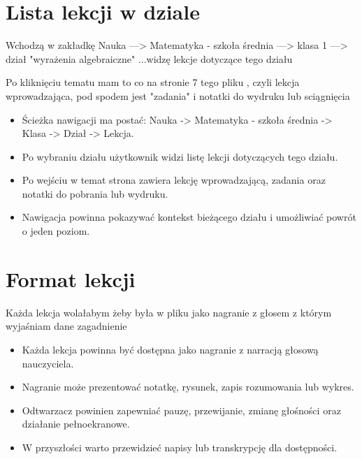 \documentclass[12pt,a4paper]{report}
\begin{document}
\section{Lista lekcji w dziale}
\begin{ElearnReviewComment}[title={Komentarz nr 11 -- Anna Kogut, 2026-07-22}]
Wchodzą w zakładkę Nauka ---> Matematyka - szkoła średnia ---> klasa 1 ---> dział "wyrażenia algebraiczne" ...widzę lekcje dotyczące tego działu

Po kliknięciu tematu mam to co na stronie 7 tego pliku , czyli lekcja wprowadzająca, pod spodem jest "zadania" i notatki do wydruku lub sciągnięcia
\end{ElearnReviewComment}
\begin{ElearnRequirement}[title={Wymagania wynikające z komentarza}]
\begin{itemize}
  \item Ścieżka nawigacji ma postać: Nauka -> Matematyka - szkoła średnia -> Klasa -> Dział -> Lekcja.
  \item Po wybraniu działu użytkownik widzi listę lekcji dotyczących tego działu.
  \item Po wejściu w temat strona zawiera lekcję wprowadzającą, zadania oraz notatki do pobrania lub wydruku.
  \item Nawigacja powinna pokazywać kontekst bieżącego działu i umożliwiać powrót o jeden poziom.
\end{itemize}
\end{ElearnRequirement}
\section{Format lekcji}
\begin{ElearnReviewComment}[title={Komentarz nr 12 -- Anna Kogut, 2026-07-22}]
Każda lekcja wolałabym żeby była w pliku jako nagranie z głosem z którym wyjaśniam dane zagadnienie
\end{ElearnReviewComment}
\begin{ElearnRequirement}[title={Wymagania wynikające z komentarza}]
\begin{itemize}
  \item Każda lekcja powinna być dostępna jako nagranie z narracją głosową nauczyciela.
  \item Nagranie może prezentować notatkę, rysunek, zapis rozumowania lub wykres.
  \item Odtwarzacz powinien zapewniać pauzę, przewijanie, zmianę głośności oraz działanie pełnoekranowe.
  \item W przyszłości warto przewidzieć napisy lub transkrypcję dla dostępności.
\end{itemize}
\end{ElearnRequirement}
\clearpage
\end{document}

